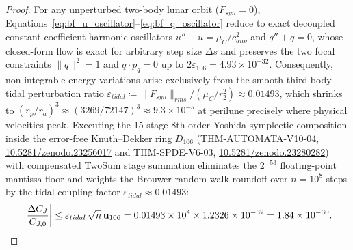 \documentclass[11pt,a4paper,reqno]{article}
\def\bm#1{#1}%
\def\texttt#1{#1}%
\def\mathrm#1{#1}%
\def\mathcal#1{#1}%
\def\mathbb#1{#1}%
\newcommand{\zenodo}[1]{\href{https://doi.org/10.5281/zenodo.#1}{\texttt{10.5281/\allowbreak zenodo.#1}}}
\theoremstyle{plain}
\theoremstyle{definition}
\theoremstyle{remark}
\numberwithin{equation}{section}
\begin{document}
\begin{proof}
For any unperturbed two-body lunar orbit ($\bm{\mathcal{F}}_{\mathrm{syn}} = \bm{0}$), Equations~\eqref{eq:bf_u_oscillator}--\eqref{eq:bf_q_oscillator} reduce to exact decoupled constant-coefficient harmonic oscillators $u'' + u = \mu_{\mathbb{C}}/c_{\mathrm{ang}}^2$ and $\bm{q}'' + \bm{q} = \bm{0}$, whose closed-form flow is exact for arbitrary step size $\Delta s$ and preserves the two focal constraints $\|\bm{q}\|^2 = 1$ and $\bm{q}\cdot\bm{p}_q = 0$ up to $2\varepsilon_{106} = 4.93 \times 10^{-32}$. Consequently, non-integrable energy variations arise exclusively from the smooth third-body tidal perturbation ratio $\varepsilon_{\mathrm{tidal}} \coloneqq \|\bm{\mathcal{F}}_{\mathrm{syn}}\|_{\mathrm{rms}} / (\mu_{\mathbb{C}}/r_2^2) \approx 0.01493$, which shrinks to $(r_p / r_a)^3 \approx (3269 / 72147)^3 \approx 9.3 \times 10^{-5}$ at perilune precisely where physical velocities peak. Executing the 15-stage 8th-order Yoshida symplectic composition inside the error-free Knuth--Dekker ring $\mathbb{D}_{106}$ (\texttt{THM-AUTOMATA-V10-04}, \zenodo{23256017} and \texttt{THM-SPDE-V6-03}, \zenodo{23280282}) with compensated TwoSum stage summation eliminates the $2^{-53}$ floating-point mantissa floor and weights the Brouwer random-walk roundoff over $n = 10^8$ steps by the tidal coupling factor $\varepsilon_{\mathrm{tidal}} \approx 0.01493$:
\begin{equation*}
  \left|\frac{\Delta C_J}{C_{J,0}}\right| \le \varepsilon_{\mathrm{tidal}}\,\sqrt{n}\,\mathbf{u}_{106} = 0.01493 \times 10^4 \times 1.2326 \times 10^{-32} = \bm{1.84 \times 10^{-30}}. \qedhere
\end{equation*}
\end{proof}
\end{document}
